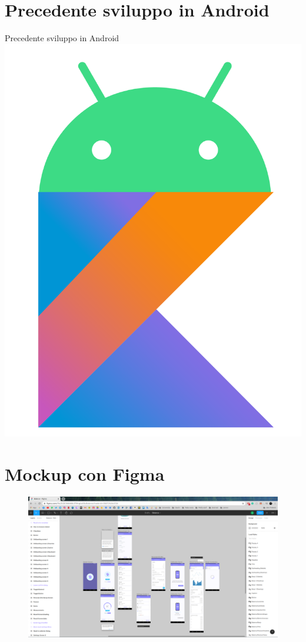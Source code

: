 \documentclass{beamer}
\begin{document}
    \section{Precedente sviluppo in Android}
    \begin{frame}{Precedente sviluppo in Android}
        \centering
        \includegraphics[scale=0.08]{../figures/android_kotlin.png}
    \end{frame}

    \section{Mockup con Figma}
    \begin{frame}
        \begin{figure}
            \centering
            \includegraphics[width=\textwidth]{../figures/figma.png}
        \end{figure}
    \end{frame}
    
\end{document}
